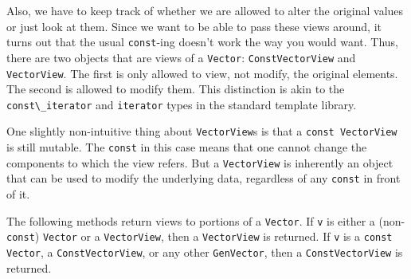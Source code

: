 \documentclass[twoside,letterpaper,11pt]{article}
\renewcommand{\tt}[1]{{\lstinline {#1}}}
\begin{document}
Also, we have to 
keep track of whether we are allowed to alter the original values or
just look at them.  
Since we want to be able to pass these views around, it turns out that
the usual \tt{const}-ing doesn't work the way you would want.
Thus, there are two objects that are views of a
\tt{Vector}:
\tt{ConstVectorView} and \tt{VectorView}.  
The first is only allowed to view,
not modify, the original elements.  The second is allowed to modify them.
This distinction is akin to the \tt{const\_iterator} and \tt{iterator} types in the
standard template library.

One slightly non-intuitive thing about \tt{VectorView}s is that a 
\tt{const VectorView} is still mutable.  The \tt{const} in this case
means that one cannot change the components to which the view refers.
But a \tt{VectorView} is inherently an object that can be used to 
modify the underlying data, regardless of any \tt{const} in front of it.

The following methods return views to portions of a \tt{Vector}.
If \tt{v} is either a (non-\tt{const}) \tt{Vector}
or a \tt{VectorView}, then a \tt{VectorView} is returned.
If \tt{v} is a \tt{const Vector}, a \tt{ConstVectorView}, or any other \tt{GenVector},
then a \tt{ConstVectorView} is returned.  
\end{document}

